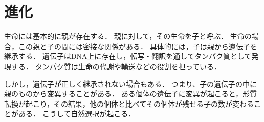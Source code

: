 \section{進化}

生命には基本的に親が存在する．
親に対して，その生命を子と呼ぶ．
生命の場合，この親と子の間には密接な関係がある．
具体的には，子は親から遺伝子を継承する．
遺伝子はDNA上に存在し，転写・翻訳を通してタンパク質として発現する．
タンパク質は生命の代謝や輸送などの役割を担っている．

しかし，遺伝子が正しく継承されない場合もある．
つまり、子の遺伝子の中に親のものから変異することがある．
ある個体の遺伝子に変異が起こると，形質転換が起こり，その結果，他の個体と比べてその個体が残せる子の数が変わることがある．
こうして自然選択が起こる．